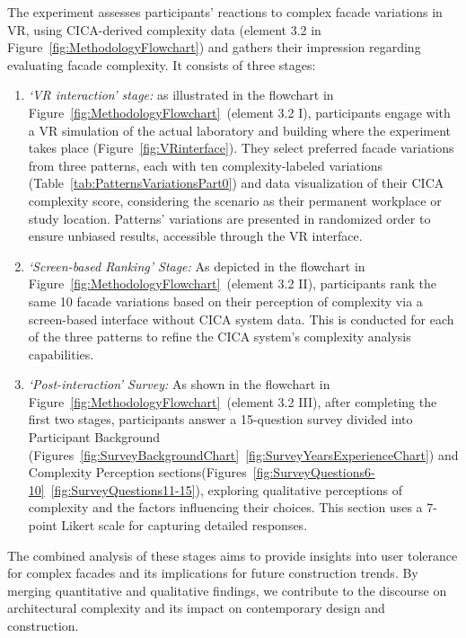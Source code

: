 %    

The experiment assesses participants' reactions to complex facade variations in VR, using CICA-derived complexity data (element 3.2 in Figure~\ref{fig:MethodologyFlowchart}) and gathers their impression regarding evaluating facade complexity.
It consists of three stages:

\begin{enumerate}
    \item \textit{`VR interaction' stage:}  as illustrated in the flowchart in Figure~\ref{fig:MethodologyFlowchart}~(element 3.2 I), participants engage with a VR simulation of the actual laboratory and building where the experiment takes place (Figure~\ref{fig:VRinterface}). They select preferred facade variations from three patterns, each with ten complexity-labeled variations (Table~\ref{tab:PatternsVariationsPart0}) and data visualization of their CICA complexity score, considering the scenario as their permanent workplace or study location.
    Patterns' variations are presented in randomized order to ensure unbiased results, accessible through the VR interface.

    \item \textit{`Screen-based Ranking' Stage:} As depicted in the flowchart in Figure~\ref{fig:MethodologyFlowchart}~(element 3.2 II), participants rank the same 10 facade variations based on their perception of complexity via a screen-based interface without CICA system data.
    This is conducted for each of the three patterns to refine the CICA system's complexity analysis capabilities.

    \item \textit{`Post-interaction' Survey:} As shown in the flowchart in Figure~\ref{fig:MethodologyFlowchart}~(element 3.2 III), after completing the first two stages, participants answer a 15-question survey divided into Participant Background (Figures~\ref{fig:SurveyBackgroundChart}~\ref{fig:SurveyYearsExperienceChart}) and Complexity Perception sections(Figures~\ref{fig:SurveyQuestions6-10}~\ref{fig:SurveyQuestions11-15}), exploring qualitative perceptions of complexity and the factors influencing their choices.
    This section uses a 7-point Likert scale for capturing detailed responses.
\end{enumerate}


The combined analysis of these stages aims to provide insights into user tolerance for complex facades and its implications for future construction trends.
By merging quantitative and qualitative findings, we contribute to the discourse on architectural complexity and its impact on contemporary design and construction.